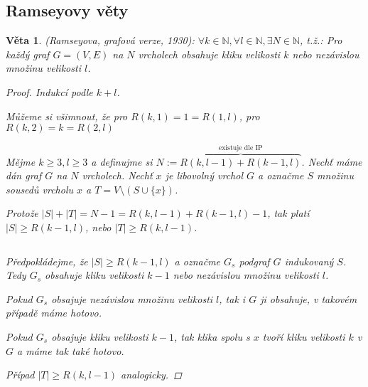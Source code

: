 \documentclass[10pt,a4paper]{article}
\newtheorem{veta}{Věta}
\newcommand{\N}{{\mathbb{N}}}       %
\begin{document}
\newpage
\subsection{Ramseyovy věty}

\begin{veta}(Ramseyova, grafová verze, 1930): \normalfont
    $\forall k \in \N, \forall l \in \N, \exists N \in \N$, t.ž.: Pro každý graf $G=(V,E)$ na $N$ vrcholech obsahuje kliku velikosti $k$ nebo nezávislou množinu velikosti $l$.
    \begin{proof} Indukcí podle $k+l$.
        
        Můžeme si všimnout, že pro $R(k,1) = 1 = R(1,l)$, pro $R(k,2) = k = R(2,l)$

        Mějme $k\geq 3, l\geq 3$ a definujme si $N:=\overbrace{R(k,l-1) + R(k-1,l)}^{\text{existuje dle IP}}$.
        Nechť máme dán graf $G$ na $N$ vrcholech. Nechť $x$ je libovolný vrchol $G$ a označme $S$ množinu sousedů vrcholu $x$ a $T=V\setminus(S \cup \{x\})$.

        Protože $|S| + |T|= N-1 = R(k,l-1)+R(k-1,l)-1$, tak platí $|S|\geq R(k-1,l)$, nebo $|T| \geq R(k,l-1)$.

        $ $

        Předpokládejme, že $|S| \geq R(k-1, l)$ a označme $G_s$ podgraf $G$ indukovaný $S$.
        Tedy $G_s$ obsahuje kliku velikosti $k-1$ nebo nezávislou množinu velikosti $l$.

        Pokud $G_s$ obsajuje nezávislou množinu velikosti $l$, tak i $G$ ji obsahuje, v takovém případě máme hotovo.
        
        Pokud $G_s$ obsajuje kliku velikosti $k-1$, tak klika spolu s $x$ tvoří kliku velikosti $k$ v $G$ a máme tak také hotovo.

        Případ $|T|\geq R(k,l-1)$ analogicky.
    \end{proof}
\end{veta}
\end{document}

